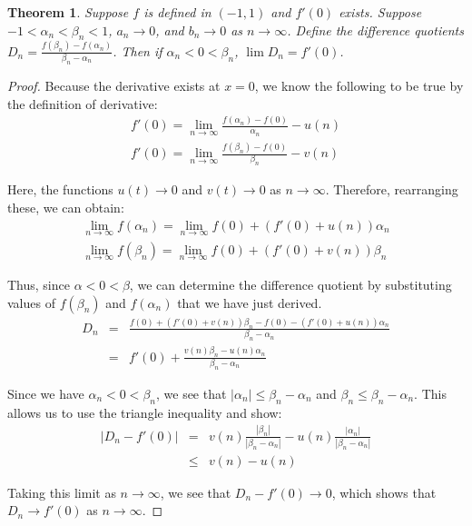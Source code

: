\documentclass[psamsfonts]{amsart}
\newtheorem{thm}{Theorem}[section]
\theoremstyle{definition}
\theoremstyle{remark}
\numberwithin{equation}{section}
\begin{document}
\begin{thm}
Suppose $f$ is defined in $(-1,1)$ and $f'(0)$ exists. Suppose $-1 < \alpha_n < \beta_n < 1$, $a_n \to 0$, and $b_n \to 0$ as $n \to \infty$. Define the difference quotients $D_n = \frac{f(\beta_n) - f( \alpha_n)}{\beta_n - \alpha_n}$. Then if $\alpha_n < 0 < \beta_n$, $\lim D_n = f'(0)$. 
\end{thm}

\begin{proof}
Because the derivative exists at $x = 0$, we know the following to be true by the definition of derivative:
\begin{eqnarray}
f'(0) = \lim_{n \to \infty } \frac{f(\alpha_n) - f(0) }{\alpha_n } - u(n)\\
f'(0) = \lim_{n \to \infty} \frac{f(\beta_n) - f(0)}{ \beta_n}- v(n)
\end{eqnarray}

Here, the functions $u(t) \to 0$ and $v(t) \to 0$ as $n \to \infty$. Therefore, rearranging these, we can obtain:
\begin{eqnarray}
\lim_{n \to \infty} f(\alpha_n) = \lim_{n \to \infty} f(0) + (f'(0) + u(n)) \alpha_n \\
\lim_{n \to \infty} f(\beta_n) = \lim_{n \to \infty} f(0) + (f'(0) + v(n)) \beta_n
\end{eqnarray}

Thus, since $\alpha < 0 < \beta$, we can determine the difference quotient by substituting values of $f(\beta_n)$ and $f(\alpha_n)$ that we have just derived.
\begin{eqnarray}
D_n &=& \frac{f(0) + (f'(0) + v(n)) \beta_n - f(0) - (f'(0) + u(n)) \alpha_n}{\beta_n - \alpha_n} \\
&=& f'(0) + \frac{v(n) \beta_n - u(n) \alpha_n}{\beta_n - \alpha_n}
\end{eqnarray}

Since we have $\alpha_n < 0 < \beta_n$, we see that $|\alpha_n| \leq \beta_n - \alpha_n$ and $\beta_n \leq \beta_n - \alpha_n$. This allows us to use the triangle inequality and show:
\begin{eqnarray}
|D_n - f'(0)| &=& v(n) \frac{|\beta_n|}{|\beta_n - \alpha_n|} - u(n)\frac{| \alpha_n|}{|\beta_n - \alpha_n|} \\
&\leq & v(n) - u(n) 
\end{eqnarray}

Taking this limit as $n \to \infty$, we see that $D_n - f'(0) \to 0$, which shows that $D_n \to f'(0)$ as $n \to \infty$. 
\end{proof}
\end{document}
